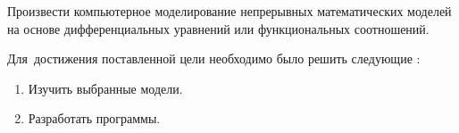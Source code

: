 
{\actuality} 

{\aim} Произвести компьютерное моделирование непрерывных математических моделей на основе дифференциальных уравнений или функциональных соотношений.

Для~достижения поставленной цели необходимо было решить следующие {\tasks}:
\begin{enumerate}
  \item Изучить выбранные модели.
  \item Разработать программы.
\end{enumerate}
    

